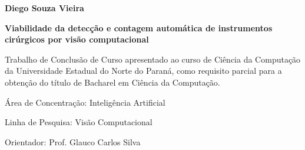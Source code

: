     \thispagestyle{empty}

    \fontsize{14}{17} \selectfont
    
    \begin{center}
    
\textbf{Diego Souza Vieira}

    \vspace{5cm}

\selectfont \textbf{Viabilidade da detecção e contagem automática de instrumentos cirúrgicos por visão computacional}

    \end{center}

    \vspace{5cm}

    \begin{flushright}\begin{minipage}{7.5cm}
    

\vspace{7pt}

Trabalho de Conclusão de Curso apresentado ao curso de Ciência da Computação da Universidade Estadual do Norte do Paraná, como requisito parcial para a obtenção do título de Bacharel em Ciência da Computação.

\vspace{7pt}

Área de Concentração: Inteligência Artificial
\vspace{7pt}

Linha de Pesquisa: Visão Computacional
\vspace{7pt}

Orientador: Prof. Glauco Carlos Silva

\vspace{7pt}


    \end{minipage}\end{flushright}

\vfill
